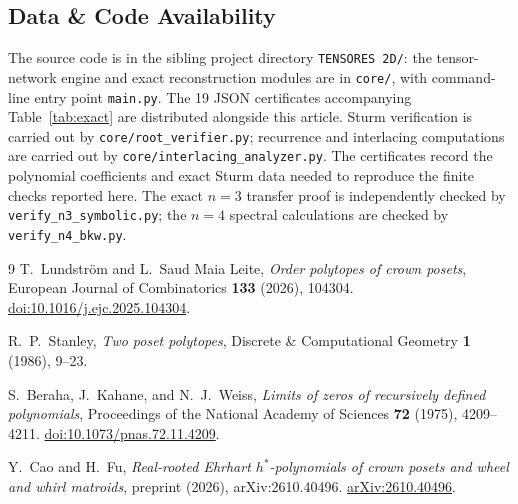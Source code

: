 \documentclass[11pt,a4paper]{article}
\theoremstyle{definition}
\begin{document}
\subsection{Data \& Code Availability}

The source code is in the sibling project directory \texttt{TENSORES 2D/}:
the tensor-network engine and exact reconstruction modules are in
\texttt{core/}, with command-line entry point \texttt{main.py}. The 19
JSON certificates accompanying Table~\ref{tab:exact} are distributed
alongside this article. Sturm verification is carried out by
\texttt{core/root\_verifier.py}; recurrence and interlacing computations
are carried out by \texttt{core/interlacing\_analyzer.py}. The
certificates record the polynomial coefficients and exact Sturm data
needed to reproduce the finite checks reported here. The exact $n=3$
transfer proof is independently checked by
\texttt{verify\_n3\_symbolic.py}; the $n=4$ spectral calculations are
checked by \texttt{verify\_n4\_bkw.py}.

\begin{thebibliography}{9}
T.~Lundstr\"om and L.~Saud Maia Leite,
\emph{Order polytopes of crown posets},
European Journal of Combinatorics \textbf{133} (2026), 104304.
\href{https://doi.org/10.1016/j.ejc.2025.104304}{doi:10.1016/j.ejc.2025.104304}.

R.~P.~Stanley,
\emph{Two poset polytopes},
Discrete \& Computational Geometry \textbf{1} (1986), 9--23.

{\raggedright
S.~Beraha, J.~Kahane, and N.~J.~Weiss,
\emph{Limits of zeros of recursively defined polynomials},
Proceedings of the National Academy of Sciences \textbf{72} (1975), 4209--4211.
\href{https://doi.org/10.1073/pnas.72.11.4209}{doi:10.1073/pnas.72.11.4209}.\par}

Y.~Cao and H.~Fu,
\emph{Real-rooted Ehrhart $h^*$-polynomials of crown posets and wheel and whirl matroids},
preprint (2026), arXiv:2610.40496.
\href{https://arxiv.org/abs/2610.40496}{arXiv:2610.40496}.
\end{thebibliography}
\end{document}
